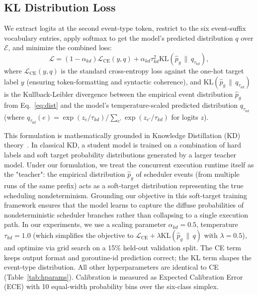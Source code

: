\documentclass[10pt,conference]{IEEEtran}
\begin{document}
\subsection{KL Distribution Loss}\label{sec:kl}

We extract logits at the second event-type token, restrict to the six event-suffix vocabulary entries, apply softmax to get the model's predicted distribution $q$ over $\mathcal{E}$, and minimize the combined loss:
\begin{equation}\label{eq:kl}
\mathcal{L} = (1 - \alpha_{kd}) \mathcal{L}_{\mathrm{CE}}(y, q) + \alpha_{kd} \tau_{kd}^2 \mathrm{KL}(\hat{p}_g \,\|\, q_{\tau_{kd}}),
\end{equation}
where $\mathcal{L}_{\mathrm{CE}}(y, q)$ is the standard cross-entropy loss against the one-hot target label $y$ (ensuring token-formatting and syntactic coherence), and $\mathrm{KL}(\hat{p}_g \,\|\, q_{\tau_{kd}})$ is the Kullback-Leibler divergence between the empirical event distribution $\hat{p}_g$ from Eq.~\eqref{eq:dist} and the model's temperature-scaled predicted distribution $q_{\tau_{kd}}$ (where $q_{\tau_{kd}}(e) = \exp(z_e / \tau_{kd}) / \sum_{e'} \exp(z_{e'} / \tau_{kd})$ for logits $z$).

This formulation is mathematically grounded in Knowledge Distillation (KD) theory~\cite{hinton}. In classical KD, a student model is trained on a combination of hard labels and soft target probability distributions generated by a larger teacher model. Under our formulation, we treat the concurrent execution runtime itself as the "teacher": the empirical distribution $\hat{p}_g$ of scheduler events (from multiple runs of the same prefix) acts as a soft-target distribution representing the true scheduling nondeterminism. Grounding our objective in this soft-target training framework ensures that the model learns to capture the diffuse probabilities of nondeterministic scheduler branches rather than collapsing to a single execution path. In our experiments, we use a scaling parameter $\alpha_{kd} = 0.5$, temperature $\tau_{kd} = 1.0$ (which simplifies the objective to $\mathcal{L}_{\mathrm{CE}} + \lambda \mathrm{KL}(\hat{p}_g\,\|\,q)$ with $\lambda = 0.5$), and optimize via grid search on a 15\% held-out validation split.
The CE term keeps output format and goroutine-id prediction correct; the KL term shapes the event-type distribution.
All other hyperparameters are identical to CE (Table~\ref{tab:hparams}).
Calibration is measured as Expected Calibration Error (ECE) with 10
equal-width probability bins over the six-class simplex.
\end{document}
